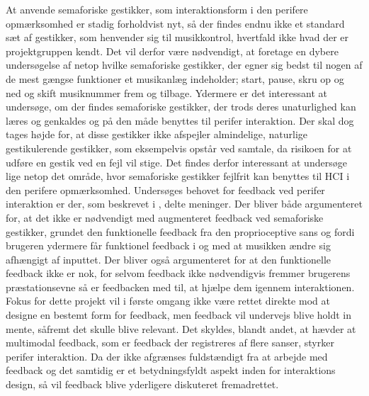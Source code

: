At anvende semaforiske gestikker, som interaktionsform i den perifere opmærksomhed er stadig forholdvist nyt, så der findes endnu ikke et standard sæt af gestikker, som henvender sig til musikkontrol, hvertfald ikke hvad der er projektgruppen kendt. Det vil derfor være nødvendigt, at foretage en dybere undersøgelse af netop hvilke semaforiske gestikker, der egner sig bedst til nogen af de mest gængse funktioner et musikanlæg indeholder; start, pause, skru op og ned og skift musiknummer frem og tilbage. Ydermere er det interessant at undersøge, om der findes semaforiske gestikker, der trods deres unaturlighed kan læres og genkaldes og på den måde benyttes til perifer interaktion. Der skal dog tages højde for, at disse gestikker ikke afspejler almindelige, naturlige gestikulerende gestikker, som eksempelvis opstår ved samtale, da risikoen for at udføre en gestik ved en fejl vil stige. Det findes derfor interessant at undersøge lige netop det område, hvor semaforiske gestikker fejlfrit kan benyttes til HCI i den perifere opmærksomhed. \blankline
%
Undersøges behovet for feedback ved perifer interaktion er der, som beskrevet i , delte meninger. Der bliver både argumenteret for, at det ikke er nødvendigt med augmenteret feedback ved semaforiske gestikker, grundet den funktionelle feedback fra den proprioceptive sans og fordi brugeren ydermere får funktionel feedback i og med at musikken ændre sig afhængigt af inputtet. Der bliver også argumenteret for at den funktionelle feedback ikke er nok, for selvom feedback ikke nødvendigvis fremmer brugerens præstationsevne så er feedbacken med til, at hjælpe dem igennem interaktionen. Fokus for dette projekt vil i første omgang ikke være rettet direkte mod at designe en bestemt form for feedback, men feedback vil undervejs blive holdt in mente, såfremt det skulle blive relevant. Det skyldes, blandt andet, at \textcite[s. 21]{PDF:FacilitatingPIDesignAndEvaluation} hævder at multimodal feedback, som er feedback der registreres af flere sanser, styrker perifer interaktion. Da der ikke afgrænses fuldstændigt fra at arbejde med feedback og det samtidig er et betydningsfyldt aspekt inden for interaktions design, så vil feedback blive yderligere diskuteret fremadrettet.  


